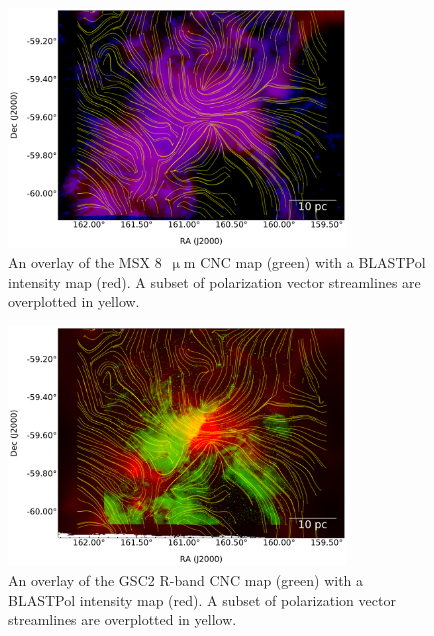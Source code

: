 \begin{figure}[!htbp]
\centering
\includegraphics[width=0.8\textwidth]{figures/carina/msx2_sl}
\caption[~An overlay of the MSX  CNC map (green) with a BLASTPol intensity map (red).]{An overlay of the MSX 8~$\upmu$m CNC map (green) \citep{smith2000large} with a BLASTPol intensity map (red). A subset of polarization vector streamlines are overplotted in yellow.}
\label{fig:msx_overplot}
\end{figure}

\begin{figure}[!htbp]
\centering
\includegraphics[width=0.8\textwidth]{figures/carina/hstgsc2_250_sl}
\caption[~An overlay of the GSC2 R-band CNC map (green) with a BLASTPol intensity map (red).]{An overlay of the GSC2 R-band CNC map (green) \citep{lasker2008second} with a BLASTPol intensity map (red). A subset of polarization vector streamlines are overplotted in yellow.}
\label{fig:hst_overplot}
\end{figure}

